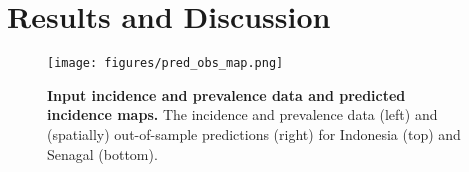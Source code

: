 \documentclass[10pt,letterpaper]{article}
\begin{document}
\section*{Results and Discussion}






\begin{figure}[!h]
\texttt{[image: figures/pred\_obs\_map.png]}
\caption{{\bf Input incidence and prevalence data and predicted incidence maps. } The incidence and prevalence data (left) and (spatially) out-of-sample predictions (right) for Indonesia (top) and Senagal (bottom).}
\label{predobsmap}
\end{figure}
\end{document}
